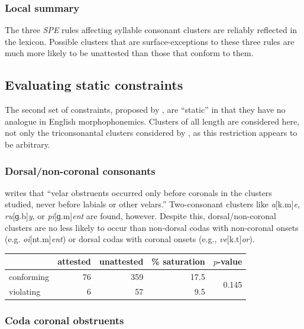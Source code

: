 \subsubsection{Local summary}

The three \emph{SPE} rules affecting syllable consonant clusters are reliably reflected in the lexicon. Possible clusters that are surface-exceptions to these three rules are much more likely to be unattested than those that conform to them.

\subsection{Evaluating static constraints}

The second set of constraints, proposed by \citet{Pierrehumbert1994}, are ``static'' in that they have no analogue in English morphophonemics. Clusters of all length are considered here, not only the triconsonantal clusters considered by \citeauthor{Pierrehumbert1994}, as this restriction appears to be arbitrary.

\subsubsection{Dorsal/non-coronal consonants}

\citet[173]{Pierrehumbert1994} writes that ``velar obstruents occurred only before coronals in the clusters studied, never before labials or other velars.'' Two-consonant clusters like \emph{a}[k.m]\emph{e}, \emph{ru}[ɡ.b]\emph{y}, or \emph{pi}[ɡ.m]\emph{ent} are found, however. Despite this, dorsal/non-coronal clusters are no less likely to occur than non-dorsal codas with non-coronal onsets (e.g. \emph{oi}[nt.m]\emph{ent}) or dorsal codas with coronal onsets (e.g., \emph{ve}[k.t]\emph{or}).

\begin{example}
\begin{tabular}{l r r r r}
\toprule
           & attested & unattested & \% saturation & $p$-value \\
\midrule
conforming & 76 & 359 & 17.5 & \multirow{2}{*}{0.145} \\
violating  &  6 &  57 & 9.5 \\
\bottomrule
\end{tabular}
\end{example}

\subsubsection{Coda coronal obstruents}

